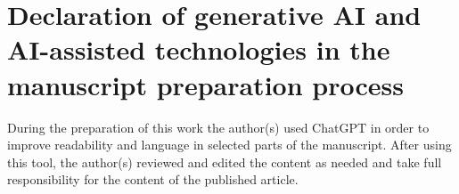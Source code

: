 \documentclass[preprint,12pt]{elsarticle}
\begin{document}
\section*{Declaration of generative AI and AI-assisted technologies in the manuscript preparation process}

During the preparation of this work the author(s) used ChatGPT in order to improve readability and language in selected parts of the manuscript. After using this tool, the author(s) reviewed and edited the content as needed and take full responsibility for the content of the published article.

 

\end{document}
